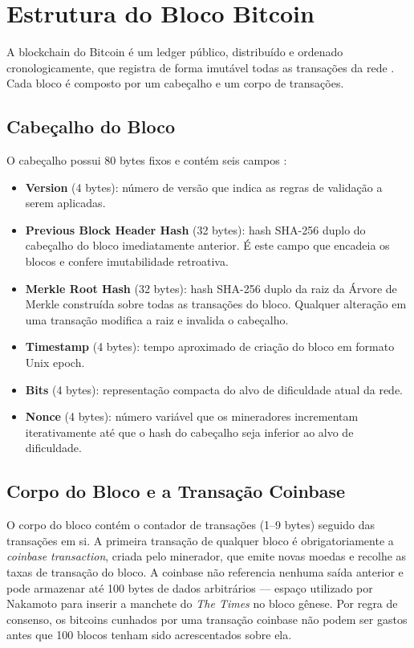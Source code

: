 \documentclass[12pt,a4paper]{report}
\begin{document}
\section{Estrutura do Bloco Bitcoin}

A blockchain do Bitcoin é um ledger público, distribuído e ordenado cronologicamente, que registra de forma imutável todas as transações da rede \cite{Bashir2023}. Cada bloco é composto por um cabeçalho e um corpo de transações.

\subsection{Cabeçalho do Bloco}

O cabeçalho possui 80 bytes fixos e contém seis campos \cite{Bashir2023}:

\begin{itemize}
    \item \textbf{Version} (4 bytes): número de versão que indica as regras de validação a serem aplicadas.
    \item \textbf{Previous Block Header Hash} (32 bytes): hash SHA-256 duplo do cabeçalho do bloco imediatamente anterior. É este campo que encadeia os blocos e confere imutabilidade retroativa.
    \item \textbf{Merkle Root Hash} (32 bytes): hash SHA-256 duplo da raiz da Árvore de Merkle construída sobre todas as transações do bloco. Qualquer alteração em uma transação modifica a raiz e invalida o cabeçalho.
    \item \textbf{Timestamp} (4 bytes): tempo aproximado de criação do bloco em formato Unix epoch.
    \item \textbf{Bits} (4 bytes): representação compacta do alvo de dificuldade atual da rede.
    \item \textbf{Nonce} (4 bytes): número variável que os mineradores incrementam iterativamente até que o hash do cabeçalho seja inferior ao alvo de dificuldade.
\end{itemize}

\subsection{Corpo do Bloco e a Transação Coinbase}

O corpo do bloco contém o contador de transações (1--9 bytes) seguido das transações em si. A primeira transação de qualquer bloco é obrigatoriamente a \textit{coinbase transaction}, criada pelo minerador, que emite novas moedas e recolhe as taxas de transação do bloco. A coinbase não referencia nenhuma saída anterior e pode armazenar até 100 bytes de dados arbitrários --- espaço utilizado por Nakamoto para inserir a manchete do \textit{The Times} no bloco gênese. Por regra de consenso, os bitcoins cunhados por uma transação coinbase não podem ser gastos antes que 100 blocos tenham sido acrescentados sobre ela.
\end{document}
